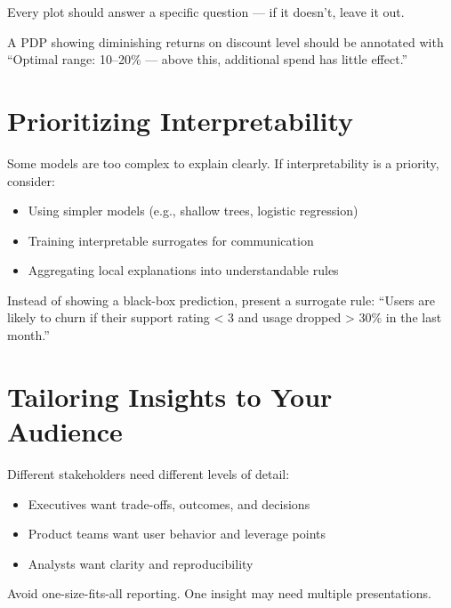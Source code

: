 \documentclass[12pt,openany, draft]{book}
\begin{document}
\begin{notebox}
Every plot should answer a specific question — if it doesn’t, leave it out.
\end{notebox}

\begin{examplebox}
A PDP showing diminishing returns on discount level should be annotated with “Optimal range: 10–20\% — above this, additional spend has little effect.”
\end{examplebox}



\section{Prioritizing Interpretability}

Some models are too complex to explain clearly. If interpretability is a priority, consider:
\begin{itemize}
  \item Using simpler models (e.g., shallow trees, logistic regression)
  \item Training interpretable surrogates for communication
  \item Aggregating local explanations into understandable rules
\end{itemize}

\begin{examplebox}
Instead of showing a black-box prediction, present a surrogate rule: “Users are likely to churn if their support rating < 3 and usage dropped > 30\% in the last month.”
\end{examplebox}



\section{Tailoring Insights to Your Audience}

Different stakeholders need different levels of detail:
\begin{itemize}
  \item Executives want trade-offs, outcomes, and decisions
  \item Product teams want user behavior and leverage points
  \item Analysts want clarity and reproducibility
\end{itemize}

\begin{notebox}
Avoid one-size-fits-all reporting. One insight may need multiple presentations.
\end{notebox}
\end{document}
